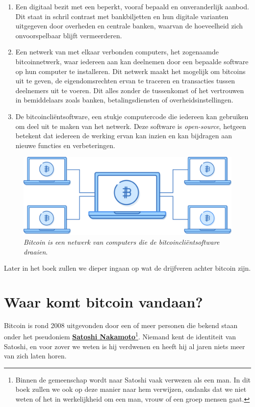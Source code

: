 \begin{enumerate}
    \item Een digitaal bezit met een beperkt, vooraf bepaald en onveranderlijk aanbod. Dit staat in schril contrast met bankbiljetten en hun digitale varianten uitgegeven door overheden en centrale banken, waarvan de hoeveelheid zich onvoorspelbaar blijft vermeerderen.
    \item  	Een netwerk van met elkaar verbonden computers, het zogenaamde bitcoinnetwerk, waar iedereen aan kan deelnemen door een bepaalde software op hun computer te installeren. Dit netwerk maakt het mogelijk om bitcoins uit te geven, de eigendomsrechten ervan te traceren en transacties tussen deelnemers uit te voeren. Dit alles zonder de tussenkomst of het vertrouwen in bemiddelaars zoals banken, betalingsdiensten of overheidsinstellingen.
    \item  	De bitcoincliëntsoftware, een stukje computercode die iedereen kan gebruiken om deel uit te maken van het netwerk. Deze software is \textit{open-source}, hetgeen betekent dat iedereen de werking ervan kan inzien en kan bijdragen aan nieuwe functies en verbeteringen.

\end{enumerate}
\begin{figure}[h]
    \centering
    \includegraphics[width=\textwidth]{images/fig1.png}
    \caption{\footnotesize{\textit{Bitcoin is een netwerk van computers die de bitcoincliëntsoftware draaien}.}}
    \label{fig1}
\end{figure}

\noindent Later in het boek zullen we dieper ingaan op wat de drijfveren achter bitcoin zijn.

\clearpage
\section{Waar komt bitcoin vandaan?}

Bitcoin is rond 2008 uitgevonden door een of meer personen die bekend staan onder het pseudoniem  \href{https://nl.wikipedia.org/wiki/Satoshi_Nakamoto}{\textbf{Satoshi Nakamoto}}\footnote{Binnen de gemeenschap wordt naar Satoshi vaak verwezen als een man. In dit boek zullen we ook op deze manier naar hem verwijzen, ondanks dat we niet weten of het in werkelijkheid om een man, vrouw of een groep mensen gaat.}. Niemand kent de identiteit van Satoshi, en voor zover we weten is hij verdwenen en heeft hij al jaren niets meer van zich laten horen.

